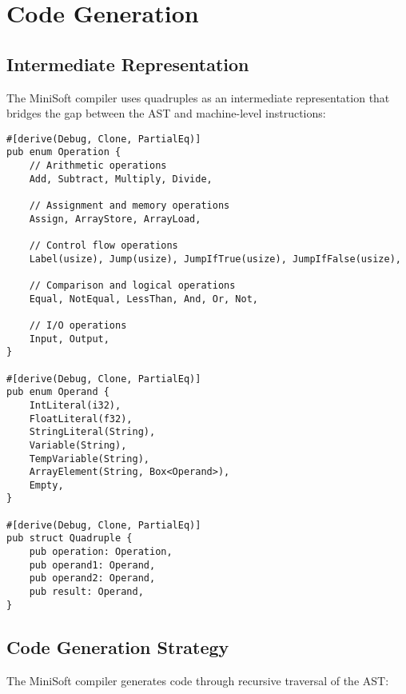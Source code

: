 \documentclass[12pt,a4paper]{article}
\begin{document}
\section{Code Generation}
\subsection{Intermediate Representation}
The MiniSoft compiler uses quadruples as an intermediate representation that bridges the gap between the AST and machine-level instructions:

\begin{lstlisting}[caption={Quadruple Structure}]
#[derive(Debug, Clone, PartialEq)]
pub enum Operation {
    // Arithmetic operations
    Add, Subtract, Multiply, Divide,
    
    // Assignment and memory operations
    Assign, ArrayStore, ArrayLoad,
    
    // Control flow operations
    Label(usize), Jump(usize), JumpIfTrue(usize), JumpIfFalse(usize),
    
    // Comparison and logical operations
    Equal, NotEqual, LessThan, And, Or, Not,
    
    // I/O operations
    Input, Output,
}

#[derive(Debug, Clone, PartialEq)]
pub enum Operand {
    IntLiteral(i32),
    FloatLiteral(f32),
    StringLiteral(String),
    Variable(String),
    TempVariable(String),
    ArrayElement(String, Box<Operand>),
    Empty,
}

#[derive(Debug, Clone, PartialEq)]
pub struct Quadruple {
    pub operation: Operation,
    pub operand1: Operand,
    pub operand2: Operand,
    pub result: Operand,
}
\end{lstlisting}

\subsection{Code Generation Strategy}
The MiniSoft compiler generates code through recursive traversal of the AST:
\end{document}
